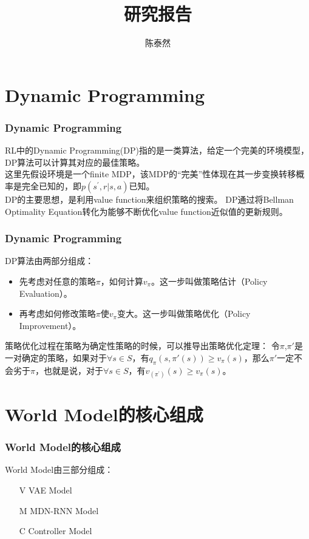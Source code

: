 \documentclass{beamer}
\title{研究报告}
\author{陈泰然}
\institute{USTC nelslip}
\begin{document}
\frame{\titlepage}



\section{Dynamic Programming}

\begin{frame}
	\frametitle{Dynamic Programming}
	RL中的Dynamic Programming(DP)指的是一类算法，给定一个完美的环境模型，DP算法可以计算其对应的最佳策略。\\
	这里先假设环境是一个finite MDP，该MDP的“完美”性体现在其一步变换转移概率是完全已知的，即$p(s^{'},r|s,a)$已知。\\
	DP的主要思想，是利用value function来组织策略的搜索。 DP通过将Bellman Optimality Equation转化为能够不断优化value function近似值的更新规则。
\end{frame}

\begin{frame}
	\frametitle{Dynamic Programming}
	DP算法由两部分组成：
	\begin{itemize}
		\item 先考虑对任意的策略$\pi$，如何计算$v_\pi$。这一步叫做策略估计（Policy Evaluation）。
		\item 再考虑如何修改策略$\pi$使$v_\pi$变大。这一步叫做策略优化（Policy Improvement）。
	\end{itemize}
	策略优化过程在策略为确定性策略的时候，可以推导出策略优化定理：
	令$\pi$,$\pi'$是一对确定的策略，如果对于$\forall s\in S$，有$q_\pi (s,\pi'(s))\ge v_\pi (s)$，那么$\pi'$一定不会劣于$\pi$，也就是说，对于$\forall s\in S$，有$v_(\pi^{'} ) (s)\ge v_\pi (s)$。
\end{frame}

\section{World Model的核心组成}

\begin{frame}
	\frametitle{World Model的核心组成}
	World Model由三部分组成：
	\begin{itemize}
		\item[V] VAE Model
		\item[M] MDN-RNN Model
		\item[C] Controller Model
	\end{itemize}
\end{frame}
\end{document}
